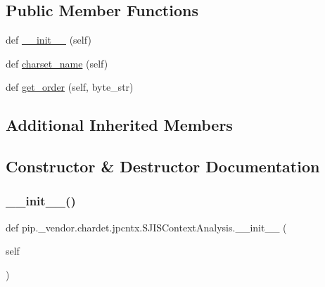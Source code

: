 \subsection*{Public Member Functions}
\begin{DoxyCompactItemize}
\item 
def \hyperlink{classpip_1_1__vendor_1_1chardet_1_1jpcntx_1_1SJISContextAnalysis_ad9450681529772b2511f45e7ef3205bf}{\+\_\+\+\_\+init\+\_\+\+\_\+} (self)
\item 
def \hyperlink{classpip_1_1__vendor_1_1chardet_1_1jpcntx_1_1SJISContextAnalysis_ac4cd814e34f5e268cc8aed29cb1aaa22}{charset\+\_\+name} (self)
\item 
def \hyperlink{classpip_1_1__vendor_1_1chardet_1_1jpcntx_1_1SJISContextAnalysis_a395ed5188cdbc65a30f2859b30083446}{get\+\_\+order} (self, byte\+\_\+str)
\end{DoxyCompactItemize}
\subsection*{Additional Inherited Members}


\subsection{Constructor \& Destructor Documentation}
\mbox{\label{classpip_1_1__vendor_1_1chardet_1_1jpcntx_1_1SJISContextAnalysis_ad9450681529772b2511f45e7ef3205bf}} 
\subsubsection{\texorpdfstring{\+\_\+\+\_\+init\+\_\+\+\_\+()}{\_\_init\_\_()}}
{\footnotesize\ttfamily def pip.\+\_\+vendor.\+chardet.\+jpcntx.\+S\+J\+I\+S\+Context\+Analysis.\+\_\+\+\_\+init\+\_\+\+\_\+ (\begin{DoxyParamCaption}\item[{}]{self }\end{DoxyParamCaption})}



